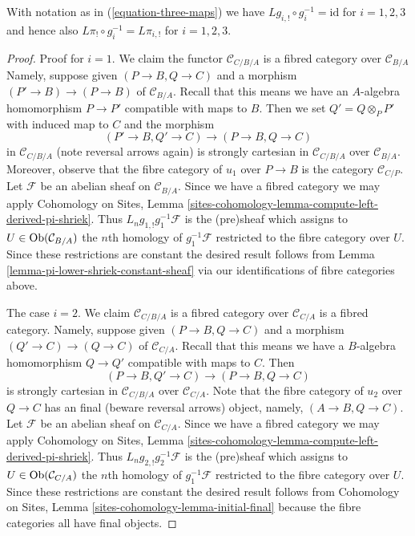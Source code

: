 \begin{lemma}
\label{lemma-triangle-compute-lower-shriek}
With notation as in (\ref{equation-three-maps}) we have
$Lg_{i, !} \circ g_i^{-1} = \text{id}$ for $i = 1, 2, 3$
and hence also $L\pi_! \circ g_i^{-1} = L\pi_{i, !}$ for
$i = 1, 2, 3$.
\end{lemma}

\begin{proof}
Proof for $i = 1$. We claim the functor $\mathcal{C}_{C/B/A}$
is a fibred category over $\mathcal{C}_{B/A}$
Namely, suppose given $(P \to B, Q \to C)$
and a morphism $(P' \to B) \to (P \to B)$ of $\mathcal{C}_{B/A}$.
Recall that this means we have an $A$-algebra homomorphism
$P \to P'$ compatible with maps to $B$. Then we set $Q' = Q \otimes_P P'$
with induced map to $C$ and the morphism
$$
(P' \to B, Q' \to C) \longrightarrow (P \to B, Q \to C)
$$
in $\mathcal{C}_{C/B/A}$ (note reversal arrows again) is strongly cartesian
in $\mathcal{C}_{C/B/A}$ over $\mathcal{C}_{B/A}$. Moreover, observe
that the fibre category of $u_1$ over $P \to B$ is the category
$\mathcal{C}_{C/P}$. Let $\mathcal{F}$ be an abelian sheaf on
$\mathcal{C}_{B/A}$. Since we have a fibred category we may apply
Cohomology on Sites, Lemma
\ref{sites-cohomology-lemma-compute-left-derived-pi-shriek}.
Thus $L_ng_{1, !}g_1^{-1}\mathcal{F}$ is the (pre)sheaf
which assigns to $U \in \mathop{\mathrm{Ob}}\nolimits(\mathcal{C}_{B/A})$ the $n$th homology of
$g_1^{-1}\mathcal{F}$ restricted to the fibre category over $U$.
Since these restrictions are constant the desired result follows from
Lemma \ref{lemma-pi-lower-shriek-constant-sheaf}
via our identifications of fibre categories above.

\medskip\noindent
The case $i = 2$.
We claim $\mathcal{C}_{C/B/A}$ is a fibred category over $\mathcal{C}_{C/A}$
is a fibred category. Namely, suppose given $(P \to B, Q \to C)$
and a morphism $(Q' \to C) \to (Q \to C)$ of $\mathcal{C}_{C/A}$.
Recall that this means we have a $B$-algebra homomorphism
$Q \to Q'$ compatible with maps to $C$. Then
$$
(P \to B, Q' \to C) \longrightarrow (P \to B, Q \to C)
$$
is strongly cartesian in $\mathcal{C}_{C/B/A}$ over $\mathcal{C}_{C/A}$.
Note that the fibre category of $u_2$ over $Q \to C$ has an final
(beware reversal arrows) object, namely, $(A \to B, Q \to C)$. Let
$\mathcal{F}$ be an abelian sheaf on $\mathcal{C}_{C/A}$.
Since we have a fibred category we may apply
Cohomology on Sites, Lemma
\ref{sites-cohomology-lemma-compute-left-derived-pi-shriek}.
Thus $L_ng_{2, !}g_2^{-1}\mathcal{F}$ is the (pre)sheaf
which assigns to $U \in \mathop{\mathrm{Ob}}\nolimits(\mathcal{C}_{C/A})$ the $n$th homology of
$g_1^{-1}\mathcal{F}$ restricted to the fibre category over $U$.
Since these restrictions are constant the desired result follows from
Cohomology on Sites, Lemma \ref{sites-cohomology-lemma-initial-final}
because the fibre categories all have final objects.


\end{proof}
